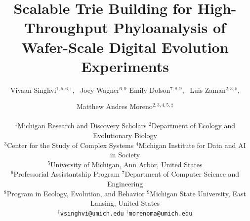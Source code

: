 \title{Scalable Trie Building for High-Throughput Phyloanalysis of Wafer-Scale Digital Evolution Experiments}

\author{
    Vivaan Singhvi$^{1,5,6,\dagger}$,\ %
    Joey Wagner$^{6,9}$
    Emily Dolson$^{7,8,9}$,\ %
    Luis Zaman$^{2,3,5}$, \and
    Matthew Andres Moreno$^{2,3,4,5,\ddagger}$ \\
    \mbox{}\\
    $^1$Michigan Research and Discovery Scholars
    $^2$Department of Ecology and Evolutionary Biology \\
    $^3$Center for the Study of Complex Systems
    $^4$Michigan Institute for Data and AI in Society \\
    $^5$University of Michigan, Ann Arbor, United States \\
    $^6$Professorial Assistantship Program
    $^7$Department of Computer Science and Engineering \\
    $^8$Program in Ecology, Evolution, and Behavior
    $^9$Michigan State University, East Lansing, United States \\
    $^\dagger$\texttt{vsinghvi@umich.edu} $^\ddagger$\texttt{morenoma@umich.edu}
}

\maketitle


\maketitle
